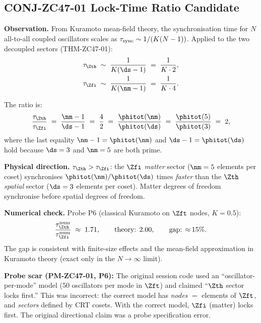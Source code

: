 \documentclass[12pt, a4paper]{article}
\begin{document}
\subsection{CONJ-ZC47-01 \quad Lock-Time Ratio Candidate}
\label{sec:conj01}


\begin{openqbox}[title={CONJ-ZC47-01: Lock-Time Ratio Candidate
  (Not Promoted to FIND)}]
\textbf{Observation.}
From Kuramoto mean-field theory, the synchronisation time for
$N$ all-to-all coupled oscillators scales as
$\tau_{\rm sync} \sim 1/(K(N-1))$.
Applied to the two decoupled sectors (THM-ZC47-01):
\begin{align*}
  \tau_{\Zth} &\;\sim\; \frac{1}{K(\ds - 1)}
    \;=\; \frac{1}{K \cdot 2}, \\
  \tau_{\Zfi} &\;\sim\; \frac{1}{K(\nm - 1)}
    \;=\; \frac{1}{K \cdot 4}.
\end{align*}

The ratio is:
\begin{equation}
  \frac{\tau_{\Zth}}{\tau_{\Zfi}}
  \;=\;
  \frac{\nm - 1}{\ds - 1}
  \;=\; \frac{4}{2}
  \;=\;
  \frac{\phitot(\nm)}{\phitot(\ds)}
  \;=\;
  \frac{\phitot(5)}{\phitot(3)}
  \;=\; 2,
  \label{eq:lockratio}
\end{equation}
where the last equality $\nm - 1 = \phitot(\nm)$ and
$\ds - 1 = \phitot(\ds)$ hold because $\ds = 3$ and $\nm = 5$
are both prime.

\textbf{Physical direction.}
$\tau_{\Zth} > \tau_{\Zfi}$: the $\Zfi$ \emph{matter} sector
($\nm = 5$ elements per coset) synchronises
$\phitot(\nm)/\phitot(\ds)$ times \emph{faster} than the
$\Zth$ \emph{spatial} sector ($\ds = 3$ elements per coset).
Matter degrees of freedom synchronise before spatial degrees
of freedom.

\textbf{Numerical check.}
Probe P6 (classical Kuramoto on $\Zft$ nodes, $K = 0.5$):
\[
  \frac{\tau_{\Zth}^{\rm num}}{\tau_{\Zfi}^{\rm num}}
  \;\approx\; 1.71,
  \qquad
  \text{theory: } 2.00,
  \qquad
  \text{gap: } {\approx}\, 15\%.
\]
The gap is consistent with finite-size effects and the
mean-field approximation in Kuramoto theory (exact only in the
$N \to \infty$ limit).

\textbf{Probe scar (PM-ZC47-01, P6):}
The original session code used an ``oscillator-per-mode'' model
(50 oscillators per mode in $\Zft$) and claimed ``$\Zth$ sector
locks first.'' This was incorrect: the correct model has
\emph{nodes} $=$ elements of $\Zft$, and \emph{sectors} defined
by CRT cosets.
With the correct model, $\Zfi$ (matter) locks first.
The original directional claim was a probe specification error.


\end{openqbox}
\end{document}
